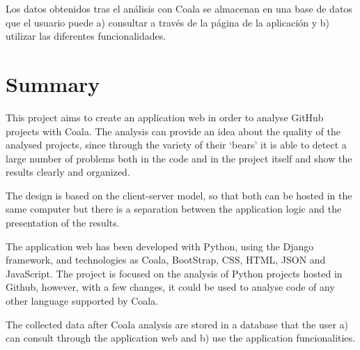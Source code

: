 \documentclass[a4paper, 12pt]{book}
\begin{document}
Los datos obtenidos tras el análisis con Coala se almacenan en una base de datos que el usuario
puede a) consultar a través de la página de la aplicación y b) utilizar las diferentes funcionalidades.

\chapter*{Summary}

This project aims to create an application web in order to analyse GitHub projects with Coala. The analysis can provide an idea about the quality of the analysed projects, since through the variety of their `bears' it is able to detect a large number of problems both in the code and in the project itself and show the results clearly and organized.

The design is based on the client-server model, so that both can be hosted in the same computer but there is a separation between the application logic and the presentation of the results.

The application web has been developed with Python, using the Django framework, and technologies as Coala, BootStrap, CSS, HTML, JSON and JavaScript. The project is focused on the analysis of Python projects hosted in Github, however, with a few changes, it could be used to analyse code of any other language supported by Coala.

The collected data after Coala analysis are stored in a database that the user a) can consult through the application web and b) use the application funcionalities.



\tableofcontents 
\cleardoublepage
\listoffigures %
\end{document}

